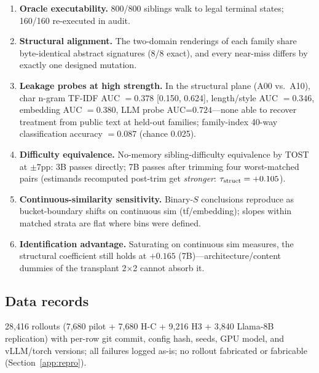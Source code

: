 \begin{enumerate}[leftmargin=1.8em]
  \item \textbf{Oracle executability.} 800/800 siblings walk to legal terminal states; 160/160 re-executed in audit.
  \item \textbf{Structural alignment.} The two-domain renderings of each family share byte-identical abstract signatures (8/8 exact), and every near-miss differs by exactly one designed mutation.
  \item \textbf{Leakage probes at high strength.} In the structural plane (A00 vs.\ A10), char n-gram TF-IDF AUC $=0.378$ [0.150, 0.624], length/style AUC $=0.346$, embedding AUC $=0.380$, LLM probe AUC=$0.724$---none able to recover treatment from public text at held-out families; family-index 40-way classification accuracy $=0.087$ (chance 0.025).
  \item \textbf{Difficulty equivalence.} No-memory sibling-difficulty equivalence by TOST at $\pm7$pp: 3B passes directly; 7B passes after trimming four worst-matched pairs (estimands recomputed post-trim get \emph{stronger}: $\tau_{\mathrm{struct}}=+0.105$).
  \item \textbf{Continuous-similarity sensitivity.} Binary-$S$ conclusions reproduce as bucket-boundary shifts on continuous sim (tf/embedding); slopes within matched strata are flat where bins were defined.
  \item \textbf{Identification advantage.} Saturating on continuous sim measures, the structural coefficient still holds at $+0.165$ (7B)---architecture/content dummies of the transplant 2$\times$2 cannot absorb it.
\end{enumerate}

\subsection{Data records}

28{,}416 rollouts (7{,}680 pilot + 7{,}680 H-C + 9{,}216 H3 + 3{,}840 Llama-8B replication) with per-row git commit, config hash, seeds, GPU model, and vLLM/torch versions; all failures logged as-is; no rollout fabricated or fabricable (Section~\ref{app:repro}).
